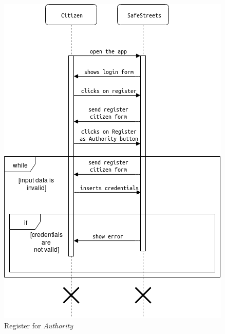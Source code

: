 \documentclass{article}
\begin{document}
\begin{figure}[H]
    \centering
    \includegraphics[scale=0.5]{img/sequence_diagrams/register_authority.png}
    \caption{Register for \textit{Authority}}
\end{figure}

\clearpage
\end{document}
